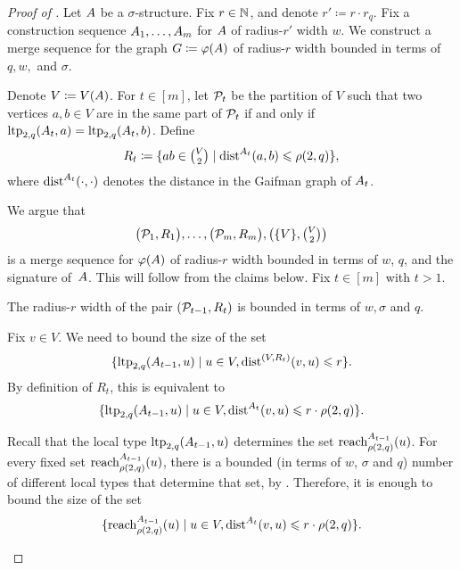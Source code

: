 \begin{proof}[Proof of ]Let $\str A$ be a $\sigma$-structure.
Fix $r\in\N$, and denote $r'\coloneqq r\cdot r_q$.
Fix  a construction sequence 
$\str A_1,\ldots,\str A_m$ for $\str A$ of radius-$r'$ width $w$.
We construct 
a merge sequence for the graph $G\coloneqq \phi(\str A)$ of radius-$r$ width bounded in terms of $q,w,$ and $\sigma$.


Denote $V\coloneqq V(\str A)$.
For $t\in[m]$,
let $\cal P_t$ be the partition of $V$
such that two vertices $a,b\in V$ are in the same part of $\cal P_t$ if and only if $\ltp_{2,q}(\str A_t,a)=\ltp_{2,q}(\str A_t,b)$.
Define $$R_t\coloneqq \setof{ab\in \mbox{$V\choose 2$}}{\dist^{\str A_t}(a,b)\le \rho(2,q)},$$
where $\dist^{\str A_t}(\cdot,\cdot)$ denotes the distance in the Gaifman graph of $\str A_t$.

We argue that 
\begin{align}\label{eq:ms}
  \bigl(\cal P_1,R_1\bigr),\ldots,\bigl(\cal P_m,R_m\bigr),\bigl(\set{V},\mbox{${V\choose 2}$}\bigr)
\end{align}
  is a merge sequence for $\phi(\str A)$ of radius-\(r\) width bounded in terms of $w$, $q$, and the signature of~$\str A$. This will follow from the claims below.
Fix $t\in[m]$ with $t>1$.


\begin{claim}\label{cl:width}
  The radius-$r$ width of the pair $(\cal P_{t-1},R_{t})$ is bounded in terms of \(w,\sigma\) and \(q\).
\end{claim}
\begin{claimproof}
  Fix $v\in V$.
  We need to bound the size of  the set
  $$\setof{\ltp_{2,q}(\str A_{t-1},u)}{u\in V,\dist^{(V,R_t)}(v,u)\le r}.$$
  By definition of \(R_t\), this is equivalent to
  $$\setof{\ltp_{2,q}(\str A_{t-1},u)}{u\in V,\dist^{A_t}(v,u)\le r \cdot \rho(2,q)}.$$

Recall that the local type $\ltp_{2,q}(\str A_{t-1},u)$ 
determines the set $\reach^{\str A_{t-1}}_{\rho(2,q)}(u)$.
For every fixed set $\reach^{\str A_{t-1}}_{\rho(2,q)}(u)$,
there is a bounded (in terms of $w$, $\sigma$ and $q$) number of different local types that 
determine that set, by .
Therefore, it is enough to bound the size of the set 
\begin{align}\label{eq:closrels-size}
\setof{\reach^{\str A_{t-1}}_{\rho(2,q)}(u)}{u\in V,\dist^{A_t}(v,u)\le r \cdot \rho(2,q)}.  
\end{align}




\end{claimproof}
\end{proof}
